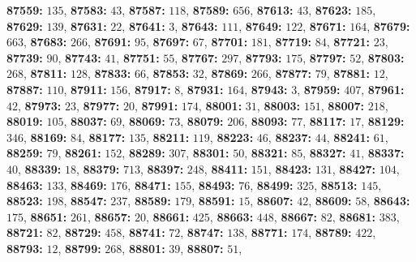 \textsf{\bfseries 87559:} $135$, \textsf{\bfseries 87583:} $43$, \textsf{\bfseries 87587:} $118$, \textsf{\bfseries 87589:} $656$, \textsf{\bfseries 87613:} $43$, \textsf{\bfseries 87623:} $185$, \textsf{\bfseries 87629:} $139$, \textsf{\bfseries 87631:} $22$, \textsf{\bfseries 87641:} $3$, \textsf{\bfseries 87643:} $111$, \textsf{\bfseries 87649:} $122$, \textsf{\bfseries 87671:} $164$, \textsf{\bfseries 87679:} $663$, \textsf{\bfseries 87683:} $266$, \textsf{\bfseries 87691:} $95$, \textsf{\bfseries 87697:} $67$, \textsf{\bfseries 87701:} $181$, \textsf{\bfseries 87719:} $84$, \textsf{\bfseries 87721:} $23$, \textsf{\bfseries 87739:} $90$, \textsf{\bfseries 87743:} $41$, \textsf{\bfseries 87751:} $55$, \textsf{\bfseries 87767:} $297$, \textsf{\bfseries 87793:} $175$, \textsf{\bfseries 87797:} $52$, \textsf{\bfseries 87803:} $268$, \textsf{\bfseries 87811:} $128$, \textsf{\bfseries 87833:} $66$, \textsf{\bfseries 87853:} $32$, \textsf{\bfseries 87869:} $266$, \textsf{\bfseries 87877:} $79$, \textsf{\bfseries 87881:} $12$, \textsf{\bfseries 87887:} $110$, \textsf{\bfseries 87911:} $156$, \textsf{\bfseries 87917:} $8$, \textsf{\bfseries 87931:} $164$, \textsf{\bfseries 87943:} $3$, \textsf{\bfseries 87959:} $407$, \textsf{\bfseries 87961:} $42$, \textsf{\bfseries 87973:} $23$, \textsf{\bfseries 87977:} $20$, \textsf{\bfseries 87991:} $174$, \textsf{\bfseries 88001:} $31$, \textsf{\bfseries 88003:} $151$, \textsf{\bfseries 88007:} $218$, \textsf{\bfseries 88019:} $105$, \textsf{\bfseries 88037:} $69$, \textsf{\bfseries 88069:} $73$, \textsf{\bfseries 88079:} $206$, \textsf{\bfseries 88093:} $77$, \textsf{\bfseries 88117:} $17$, \textsf{\bfseries 88129:} $346$, \textsf{\bfseries 88169:} $84$, \textsf{\bfseries 88177:} $135$, \textsf{\bfseries 88211:} $119$, \textsf{\bfseries 88223:} $46$, \textsf{\bfseries 88237:} $44$, \textsf{\bfseries 88241:} $61$, \textsf{\bfseries 88259:} $79$, \textsf{\bfseries 88261:} $152$, \textsf{\bfseries 88289:} $307$, \textsf{\bfseries 88301:} $50$, \textsf{\bfseries 88321:} $85$, \textsf{\bfseries 88327:} $41$, \textsf{\bfseries 88337:} $40$, \textsf{\bfseries 88339:} $18$, \textsf{\bfseries 88379:} $713$, \textsf{\bfseries 88397:} $248$, \textsf{\bfseries 88411:} $151$, \textsf{\bfseries 88423:} $131$, \textsf{\bfseries 88427:} $104$, \textsf{\bfseries 88463:} $133$, \textsf{\bfseries 88469:} $176$, \textsf{\bfseries 88471:} $155$, \textsf{\bfseries 88493:} $76$, \textsf{\bfseries 88499:} $325$, \textsf{\bfseries 88513:} $145$, \textsf{\bfseries 88523:} $198$, \textsf{\bfseries 88547:} $237$, \textsf{\bfseries 88589:} $179$, \textsf{\bfseries 88591:} $15$, \textsf{\bfseries 88607:} $42$, \textsf{\bfseries 88609:} $58$, \textsf{\bfseries 88643:} $175$, \textsf{\bfseries 88651:} $261$, \textsf{\bfseries 88657:} $20$, \textsf{\bfseries 88661:} $425$, \textsf{\bfseries 88663:} $448$, \textsf{\bfseries 88667:} $82$, \textsf{\bfseries 88681:} $383$, \textsf{\bfseries 88721:} $82$, \textsf{\bfseries 88729:} $458$, \textsf{\bfseries 88741:} $72$, \textsf{\bfseries 88747:} $138$, \textsf{\bfseries 88771:} $174$, \textsf{\bfseries 88789:} $422$, \textsf{\bfseries 88793:} $12$, \textsf{\bfseries 88799:} $268$, \textsf{\bfseries 88801:} $39$, \textsf{\bfseries 88807:} $51$, 

